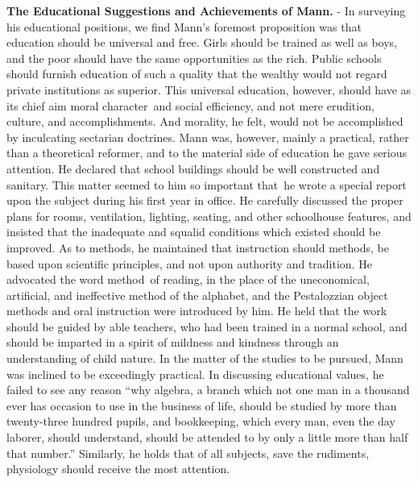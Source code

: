 \documentclass[]{book}
\begin{document}
\textbf{The Educational Suggestions and Achievements of Mann.} - In surveying his educational positions, we find Mann's foremost proposition was that education should be universal and free. Girls should be trained as well as boys, and the poor should have the same opportunities as the rich. Public schools should furnish education of such a quality that the wealthy would not regard private institutions as superior. This universal education, however, should have as its chief aim moral character~and social efficiency, and not mere erudition, culture, and accomplishments. And morality, he felt, would not be accomplished by inculcating sectarian doctrines. Mann was, however, mainly a practical, rather than a theoretical reformer, and to the material side of education he gave serious attention. He declared that school buildings should be well constructed and sanitary. This matter seemed to him so important that~he wrote a special report upon the subject during his first year in office. He carefully discussed the proper plans for rooms, ventilation, lighting, seating, and other schoolhouse features, and insisted that the inadequate and squalid conditions which existed should be improved. As to methods, he maintained that instruction should methods, be based upon scientific principles, and not upon authority and tradition. He advocated the word method~of reading, in the place of the uneconomical, artificial, and ineffective method of the alphabet, and the Pestalozzian object methods and oral instruction were introduced by him. He held that the work should be guided by able teachers, who had been trained in a normal school, and should be imparted in a spirit of mildness and kindness through an understanding of child nature. In the matter of the studies to be pursued, Mann was inclined to be exceedingly practical. In discussing educational values, he failed to see any reason ``why algebra, a branch which not one man in a thousand ever has occasion to use in the business of life, should be studied by more than twenty-three hundred pupils, and bookkeeping, which every man, even the day laborer, should understand, should be attended to by only a little more than half that number.'' Similarly, he holds that of all subjects, save the rudiments, physiology should receive the most attention.
\end{document}
